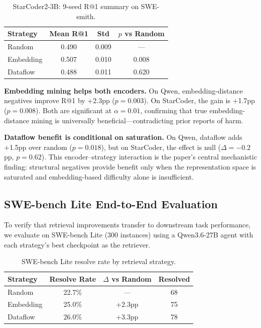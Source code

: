 \documentclass[11pt,a4paper]{article}
\begin{document}
\begin{table}[t]
\centering
\small
\caption{StarCoder2-3B: 9-seed R@1 summary on SWE-smith.}
\label{tab:starcoder_main}
\begin{tabular}{lccc}
\toprule
\textbf{Strategy} & \textbf{Mean R@1} & \textbf{Std} & \textbf{$p$ vs Random} \\
\midrule
Random & 0.490 & 0.009 & --- \\
Embedding & 0.507 & 0.010 & 0.008 \\
Dataflow & 0.488 & 0.011 & 0.620 \\
\bottomrule
\end{tabular}
\end{table}

\textbf{Embedding mining helps both encoders.} On Qwen, embedding-distance negatives improve R@1 by +2.3pp ($p{=}0.003$). On StarCoder, the gain is +1.7pp ($p{=}0.008$). Both are significant at $\alpha{=}0.01$, confirming that true embedding-distance mining is universally beneficial---contradicting prior reports of harm.

\textbf{Dataflow benefit is conditional on saturation.} On Qwen, dataflow adds +1.5pp over random ($p{=}0.018$), but on StarCoder, the effect is null ($\Delta{=}{-}0.2$pp, $p{=}0.62$). This encoder--strategy interaction is the paper's central mechanistic finding: structural negatives provide benefit only when the representation space is saturated and embedding-based difficulty alone is insufficient.

\subsection{SWE-bench Lite End-to-End Evaluation}

To verify that retrieval improvements transfer to downstream task performance, we evaluate on SWE-bench Lite (300 instances) using a Qwen3.6-27B agent with each strategy's best checkpoint as the retriever.

\begin{table}[t]
\centering
\small
\caption{SWE-bench Lite resolve rate by retrieval strategy.}
\label{tab:swebench}
\begin{tabular}{lccc}
\toprule
\textbf{Strategy} & \textbf{Resolve Rate} & \textbf{$\Delta$ vs Random} & \textbf{Resolved} \\
\midrule
Random & 22.7\% & --- & 68 \\
Embedding & 25.0\% & +2.3pp & 75 \\
Dataflow & 26.0\% & +3.3pp & 78 \\
\bottomrule
\end{tabular}
\end{table}
\end{document}
